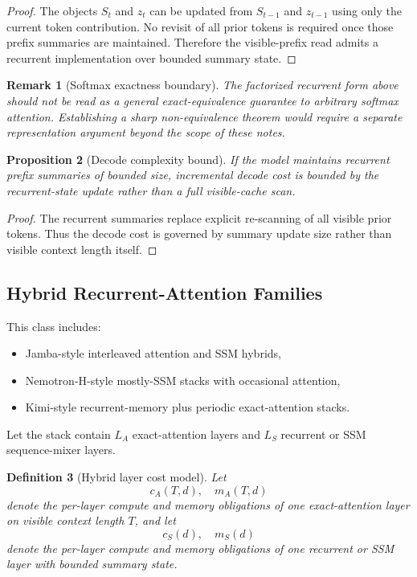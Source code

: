 \documentclass[11pt]{article}
\newtheorem{definition}{Definition}[section]
\newtheorem{proposition}[definition]{Proposition}
\newtheorem{remark}[definition]{Remark}
\begin{document}
\begin{proof}
The objects $S_t$ and $z_t$ can be updated from $S_{t-1}$ and $z_{t-1}$ using
only the current token contribution. No revisit of all prior tokens is required
once those prefix summaries are maintained. Therefore the visible-prefix read
admits a recurrent implementation over bounded summary state.
\end{proof}

\begin{remark}[Softmax exactness boundary]
The factorized recurrent form above should not be read as a general
exact-equivalence guarantee to arbitrary softmax attention.
Establishing a sharp non-equivalence theorem would require a separate
representation argument beyond the scope of these notes.
\end{remark}

\begin{proposition}[Decode complexity bound]
If the model maintains recurrent prefix summaries of bounded size, incremental
decode cost is bounded by the recurrent-state update rather than a full
visible-cache scan.
\end{proposition}

\begin{proof}
The recurrent summaries replace explicit re-scanning of all visible prior
tokens. Thus the decode cost is governed by summary update size rather than
visible context length itself.
\end{proof}

\subsection{Hybrid Recurrent-Attention Families}

This class includes:
\begin{itemize}
  \item Jamba-style interleaved attention and SSM hybrids,
  \item Nemotron-H-style mostly-SSM stacks with occasional attention,
  \item Kimi-style recurrent-memory plus periodic exact-attention stacks.
\end{itemize}

Let the stack contain $L_A$ exact-attention layers and $L_S$ recurrent or SSM
sequence-mixer layers.

\begin{definition}[Hybrid layer cost model]
Let
\[
  c_A(T, d), \quad m_A(T, d)
\]
denote the per-layer compute and memory obligations of one exact-attention
layer on visible context length $T$, and let
\[
  c_S(d), \quad m_S(d)
\]
denote the per-layer compute and memory obligations of one recurrent or SSM
layer with bounded summary state.
\end{definition}
\end{document}
